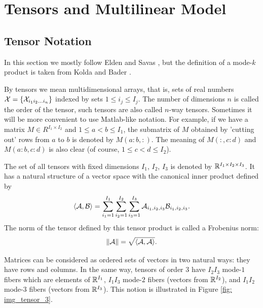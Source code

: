 \chapter{Tensors and Multilinear Model}
\label{chap_mult_model}
\section{Tensor Notation}

In this section we mostly follow Elden and Savas \cite{elden_savas_2009}, but the
definition of a mode-$k$ product is taken from  Kolda and Bader \cite{kolda_bader_2009}.


By tensors we mean multidimensional arrays, that is, sets of real numbers 
$ \mathcal{X} = \{\mathcal{X}_{i_1 i_2 \dots i_n} \} $ indexed by sets $1 \leq i_j \leq I_j$.
The number of dimensions $n$ is called the order of the tensor, such tensors 
are also called $n$-way tensors.
Sometimes it will be more convenient to use Matlab-like notation. For example, if we have a matrix $M \in R^{I_1 \times I_2}$ and $1 \leq a < b \leq I_1$, the submatrix
of $M$ obtained by 'cutting out' rows from $a$ to $b$ is denoted by $M(a:b, :)$. The meaning of 
 $M(:, c:d)$ and $M(a:b, c:d)$ is also clear (of course, $1 \leq c < d \leq I_2$).
 


The set of all tensors with fixed dimensions $I_1$, $I_2$, $I_3$ is denoted by 
${\mathbb{R}}^{I_1 \times I_2 \times I_3}$. It has a natural structure of a vector space
with the canonical inner product defined by
\begin{equation}
    \langle \mathcal{A}, \mathcal{B} \rangle = \sum_{i_1 = 1}^{I_1}  \sum_{i_2 = 1}^{I_2} \sum_{i_3 = 1}^{I_3}  \mathcal{A}_{i_1, i_2, i_3} \mathcal{B}_{i_1, i_2, i_3}.
\end{equation}
The norm of the tensor defined by this tensor product is called a Frobenius norm:
\begin{equation}
    \| \mathcal{A} \| = \sqrt{ \langle \mathcal{A}, \mathcal{A} \rangle }.
\end{equation}


Matrices can be considered as ordered sets of vectors in two natural ways: they have
rows and columns. In the same way, tensors of order $3$ have $I_2 I_3 $ mode-$1$ fibers which
are elements of $\mathbb{R}^{I_1}$, $I_1 I_3$ mode-$2$ fibers (vectors from $\mathbb{R}^{I_2}$), and $I_1 I_2$ mode-$3$
fibers (vectors from $\mathbb{R}^{I_3}$). This notion is illustrated in Figure \ref{fig: img_tensor_3}.


